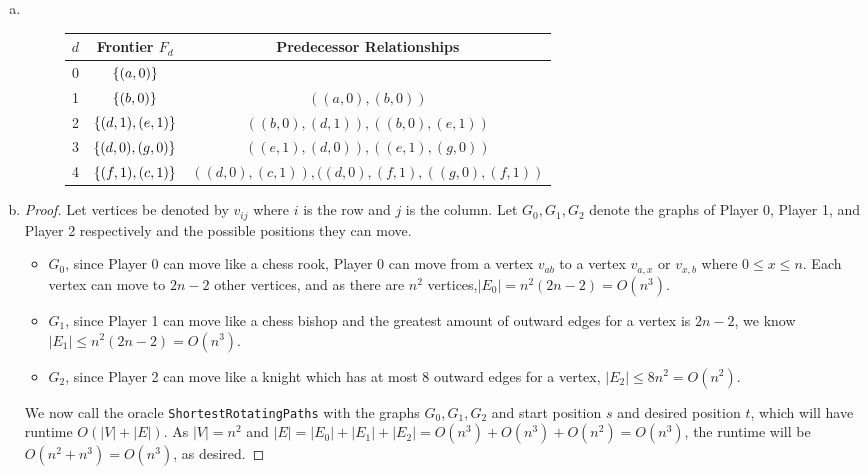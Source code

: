 \documentclass[11pt]{scrartcl}
\theoremstyle{dotlessP}
\theoremstyle{dotlessN}
\DeclarePairedDelimiter\set{\{}{\}}
\begin{document}
\begin{enumerate}[(a)]
\begin{proof}
\begin{itemize}
		\item As each edge in  $G'$ is of the form $((v_i, j), (v_t, j+1 \mod k))$, each edge is a rotation from  $G_j$ to $G_{j+1 \mod k}$. We can thus use \texttt{SingleSourceShortestPaths} to find the shortest path from any vertex to another formed by any rotated path.
	\end{itemize}
	We have shown that the problem of \texttt{ShortestRotatingWalk} from $s$ to $t$ with respect to $G_0, \dots, G_{k-1}$ can be reduced to \texttt{SingleSourceShorestPaths} with the desired runtime and that the algorithm is correct.
\end{proof}

\item \
	\begin{figure}[H]
		\centering
		\begin{tabular}{c|c|c}
			$d$ & Frontier $F_d$ & Predecessor Relationships \\
			\hline
			0 & $\set*{(a,0)}$ & \\
			1 & $\set*{(b,0)}$ &  $((a,0), (b,0))$ \\
			2 & $\set*{(d,1), (e,1)}$ &  $((b,0),(d,1)),((b,0),(e,1))$ \\
			3 & $\set*{(d,0),(g,0)}$ &  $((e,1),(d,0)),((e,1),(g,0))$ \\
			4 & $\set*{(f,1),(c,1)}$ &  $((d,0),(c,1)), ((d,0), (f,1), ((g,0),(f,1))$
		\end{tabular}
	\end{figure}
\item
\begin{proof}
	Let vertices be denoted by $v_{ij}$ where  $i$ is the row and $j$ is the column. Let $G_0, G_1, G_2$ denote the graphs of Player 0, Player 1, and Player 2 respectively and the possible positions they can move.
	\begin{itemize}
		\item $G_0$, since Player 0 can move like a chess rook, Player 0 can move from a vertex $v_{ab}$ to a vertex  $v_{a,x}$ or $v_{x,b}$ where  $0 \leq x \leq n$. Each vertex can move to $2n-2$ other vertices, and as there are $n^2$ vertices,$|E_0| = n^2(2n-2) = O(n^3)$.
		\item $G_1$, since Player 1 can move like a chess bishop and the greatest amount of outward edges for a vertex is $2n-2$, we know  $|E_1| \leq n^2(2n-2) = O(n^3)$.
		\item $G_2$, since Player 2 can move like a knight which has at most 8 outward edges for a vertex, $|E_2| \leq 8n^2 = O(n^2)$.
	\end{itemize}
	We now call the oracle \texttt{ShortestRotatingPaths} with the graphs $G_0, G_1, G_2$ and start position $s$ and desired position $t$, which will have runtime $O(|V| + |E|)$. As  $|V| = n^2$ and  $|E| = |E_0| + |E_1| + |E_2| = O(n^3) + O(n^3) + O(n^2) = O(n^3)$, the runtime will be  $O(n^2 + n^3) = O(n^3)$, as desired.
\end{proof}
\end{enumerate}
\end{document}
